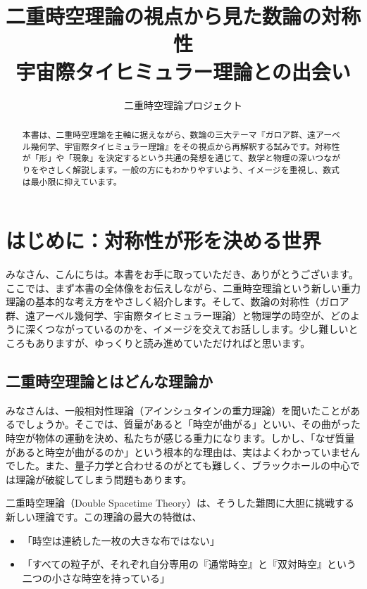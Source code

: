 \documentclass[dvipdfmx,12pt,a4paper]{jsarticle}
\title{二重時空理論の視点から見た数論の対称性\\
宇宙際タイヒミュラー理論との出会い}
\author{二重時空理論プロジェクト}
\date{}
\begin{document}
\maketitle

\begin{abstract}
本書は、二重時空理論を主軸に据えながら、数論の三大テーマ『ガロア群、遠アーベル幾何学、宇宙際タイヒミュラー理論』をその視点から再解釈する試みです。対称性が「形」や「現象」を決定するという共通の発想を通じて、数学と物理の深いつながりをやさしく解説します。一般の方にもわかりやすいよう、イメージを重視し、数式は最小限に抑えています。
\end{abstract}

\tableofcontents

\section{はじめに：対称性が形を決める世界}

みなさん、こんにちは。本書をお手に取っていただき、ありがとうございます。ここでは、まず本書の全体像をお伝えしながら、二重時空理論という新しい重力理論の基本的な考え方をやさしく紹介します。そして、数論の対称性（ガロア群、遠アーベル幾何学、宇宙際タイヒミュラー理論）と物理学の時空が、どのように深くつながっているのかを、イメージを交えてお話しします。少し難しいところもありますが、ゆっくりと読み進めていただければと思います。

\subsection{二重時空理論とはどんな理論か}

みなさんは、一般相対性理論（アインシュタインの重力理論）を聞いたことがあるでしょうか。そこでは、質量があると「時空が曲がる」といい、その曲がった時空が物体の運動を決め、私たちが感じる重力になります。しかし、「なぜ質量があると時空が曲がるのか」という根本的な理由は、実はよくわかっていませんでした。また、量子力学と合わせるのがとても難しく、ブラックホールの中心では理論が破綻してしまう問題もあります。

二重時空理論（Double Spacetime Theory）は、そうした難問に大胆に挑戦する新しい理論です。この理論の最大の特徴は、

\begin{itemize}
  \item 「時空は連続した一枚の大きな布ではない」
  \item 「すべての粒子が、それぞれ自分専用の『通常時空』と『双対時空』という二つの小さな時空を持っている」
\end{itemize}
\end{document}
